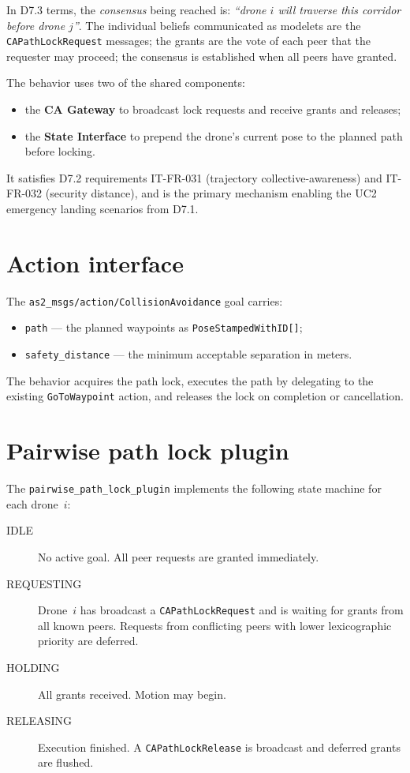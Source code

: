 \documentclass[deliverable]{csreport}
\renewcommand{\code}[1]{\texttt{\textcolor{CSMaroon}{#1}}}%
\begin{document}
In D7.3 terms, the \emph{consensus} being reached is: \emph{``drone $i$ will traverse this corridor before drone $j$''}. The individual beliefs communicated as modelets are the \code{CAPathLockRequest} messages; the grants are the vote of each peer that the requester may proceed; the consensus is established when all peers have granted.

The behavior uses two of the shared components:
\begin{itemize}
  \item the \textbf{CA Gateway} to broadcast lock requests and receive grants and releases;
  \item the \textbf{State Interface} to prepend the drone's current pose to the planned path before locking.
\end{itemize}

It satisfies D7.2 requirements IT-FR-031 (trajectory collective-awareness) and IT-FR-032 (security distance), and is the primary mechanism enabling the UC2 emergency landing scenarios from D7.1.

\section{Action interface}

The \code{as2\_msgs/action/CollisionAvoidance} goal carries:
\begin{itemize}
  \item \code{path} --- the planned waypoints as \code{PoseStampedWithID[]};
  \item \code{safety\_distance} --- the minimum acceptable separation in meters.
\end{itemize}
The behavior acquires the path lock, executes the path by delegating to the existing \code{GoToWaypoint} action, and releases the lock on completion or cancellation.

\section{Pairwise path lock plugin}

The \code{pairwise\_path\_lock\_plugin} implements the following state machine for each drone~$i$:

\begin{description}
  \item[IDLE] No active goal. All peer requests are granted immediately.
  \item[REQUESTING] Drone~$i$ has broadcast a \code{CAPathLockRequest} and is waiting for grants from all known peers. Requests from conflicting peers with lower lexicographic priority are deferred.
  \item[HOLDING] All grants received. Motion may begin.
  \item[RELEASING] Execution finished. A \code{CAPathLockRelease} is broadcast and deferred grants are flushed.
\end{description}
\end{document}
